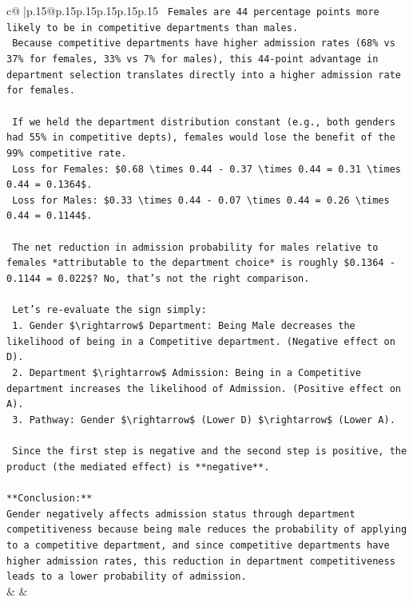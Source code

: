 \documentclass{article}
\begin{document}
{\begin{supertabular}{c@{$\;$}|p{.15\linewidth}@{}p{.15\linewidth}p{.15\linewidth}p{.15\linewidth}p{.15\linewidth}p{.15\linewidth}}
{{{\texttt{    Females are 44 percentage points more likely to be in competitive departments than males.} \\
\texttt{    Because competitive departments have higher admission rates (68\% vs 37\% for females, 33\% vs 7\% for males), this 44{-}point advantage in department selection translates directly into a higher admission rate for females.} \\
\\ 
\texttt{    If we held the department distribution constant (e.g., both genders had 55\% in competitive depts), females would lose the benefit of the 99\% competitive rate.} \\
\texttt{    Loss for Females: \$0.68 \textbackslash{}times 0.44 {-} 0.37 \textbackslash{}times 0.44 = 0.31 \textbackslash{}times 0.44 = 0.1364\$.} \\
\texttt{    Loss for Males: \$0.33 \textbackslash{}times 0.44 {-} 0.07 \textbackslash{}times 0.44 = 0.26 \textbackslash{}times 0.44 = 0.1144\$.} \\
\\ 
\texttt{    The net reduction in admission probability for males relative to females *attributable to the department choice* is roughly \$0.1364 {-} 0.1144 = 0.022\$? No, that's not the right comparison.} \\
\\ 
\texttt{    Let's re{-}evaluate the sign simply:} \\
\texttt{    1. Gender \$\textbackslash{}rightarrow\$ Department: Being Male decreases the likelihood of being in a Competitive department. (Negative effect on D).} \\
\texttt{    2. Department \$\textbackslash{}rightarrow\$ Admission: Being in a Competitive department increases the likelihood of Admission. (Positive effect on A).} \\
\texttt{    3. Pathway: Gender \$\textbackslash{}rightarrow\$ (Lower D) \$\textbackslash{}rightarrow\$ (Lower A).} \\
\\ 
\texttt{    Since the first step is negative and the second step is positive, the product (the mediated effect) is **negative**.} \\
\\ 
\texttt{**Conclusion:**} \\
\texttt{Gender negatively affects admission status through department competitiveness because being male reduces the probability of applying to a competitive department, and since competitive departments have higher admission rates, this reduction in department competitiveness leads to a lower probability of admission.} \\
            }
        }
    }
    & & \\ \\


\end{supertabular}}
\end{document}
